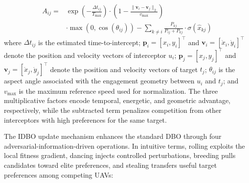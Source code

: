 \documentclass[lettersize,journal]{IEEEtran}
\begin{document}
\begin{equation}
\label{eq:adversarial_advantage}
\begin{split}
A_{ij} =& \exp\left(-\frac{\Delta t_{ij}}{T_{\max}}\right) \cdot \left(1 - \frac{\|\mathbf{v}_i - \mathbf{v}_j\|_2}{v_{\max}}\right) \\
&\cdot \max\left(0, \cos(\theta_{ij})\right) - \sum_{k\neq i} \frac{P_{kj}}{P_{ij} + P_{kj}} \cdot \sigma(\hat{x}_{kj})
\end{split}
\end{equation}
where $\Delta t_{ij}$ is the estimated time-to-intercept; $\mathbf{p}_i=[x_i, y_i]^\top$ and $\mathbf{v}_i=[\dot{x}_i, \dot{y}_i]^\top$ denote the position and velocity vectors of interceptor $u_i$; $\mathbf{p}_j=[x_j, y_j]^\top$ and $\mathbf{v}_j=[\dot{x}_j, \dot{y}_j]^\top$ denote the position and velocity vectors of target $t_j$; $\theta_{ij}$ is the aspect angle associated with the engagement geometry between $u_i$ and $t_j$; and $v_{\max}$ is the maximum reference speed used for normalization. The three multiplicative factors encode temporal, energetic, and geometric advantage, respectively, while the subtracted term penalizes competition from other interceptors with high preferences for the same target.

The IDBO update mechanism enhances the standard DBO through four adversarial-information-driven operations. In intuitive terms, rolling exploits the local fitness gradient, dancing injects controlled perturbations, breeding pulls candidates toward elite preferences, and stealing transfers useful target preferences among competing UAVs:
\end{document}
